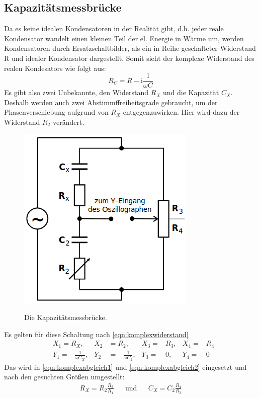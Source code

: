 \documentclass[titlepage = firstcover]{scrartcl}
\begin{document}
        \subsection{Kapazitätsmessbrücke}
          Da es keine idealen Kondensatoren in der Realität gibt, d.h. jeder reale Kondensator wandelt einen kleinen Teil der el. Energie in Wärme um,
          werden Kondensatoren durch Ersatzschaltbilder, als ein in Reihe geschalteter Widerstand R und idealer Kondensator dargestellt. Somit sieht der
          komplexe Widerstand des realen Kondesators wie folgt aus:
          \begin{equation}
            R_C = R - \text{i} \frac{1}{\omega C}
          \end{equation}
          Es gibt also zwei Unbekannte, den Widerstand $R_X$ und die Kapazität $C_X$. Deshalb werden auch zwei Abstimmffreiheitsgrade gebraucht, um der
          Phasenverschiebung aufgrund von $R_X$ entgegenzuwirken. Hier wird dazu der Widerstand $R_2$ verändert.
          \begin{figure}[h]
            \centering
            \caption{Die Kapazitätsmessbrücke.}
            \includegraphics[width = 0.4\linewidth]{Kapazitaetsmessbruecke.png}
            \label{fig:wheatstone}
          \end{figure}
          Es gelten für diese Schaltung nach \eqref{eqn:komplexwiderstand}
          \begin{align*}
            &X_1 = R_X, & X_2 &= R_2, & X_3 =& R_3, & X_4 =& R_4 \\
            &Y_1 = -\frac{1}{\omega C_X}, & Y_2 &= -\frac{1}{\omega C_2}, & Y_3 =& 0, & Y_4 =& 0
          \end{align*}
          Das wird in \eqref{eqn:komplexabgleich1} und \eqref{eqn:komplexabgleich2} eingesetzt und nach den gesuchten Größen umgestellt:
          \begin{align*}
            R_X = R_2 \frac{R_3}{R_4} &&\text{und}&& C_X = C_2 \frac{R_4}{R_3}            
          \end{align*}
\end{document}
